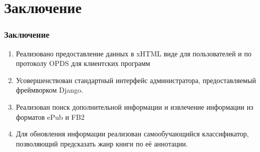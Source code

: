 \documentclass[utf8,handout]{beamer}
\begin{document}
\section{Заключение}
  \begin{frame}
    \frametitle{Заключение}
    \begin{enumerate}
      \item Реализовано предоставление данных в xHTML виде для пользователей и по протоколу OPDS для клиентских программ	  
	  \item Усовершенствован стандартный интерфейс администратора, предоставляемый фреймворком Django.
	  \item Реализован поиск дополнительной информации и извлечение информации из форматов ePub и FB2
      \item Для обновления информации реализован самообучающийся классификатор, позволяющий предсказать жанр книги по её аннотации.
	  
    \end{enumerate}
  \end{frame}
\end{document}
